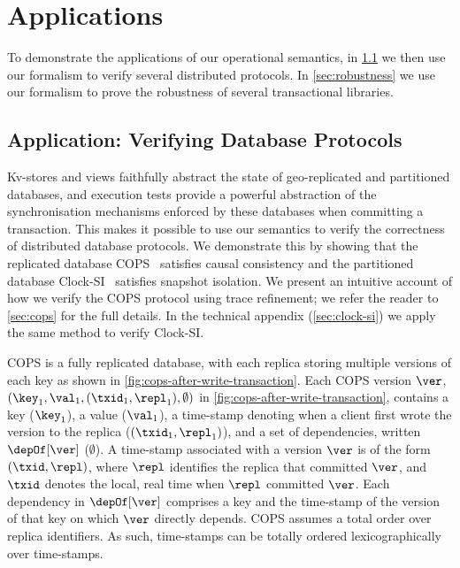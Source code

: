 \section{Applications}
\label{sec:applications}
\label{sec:program-analysis}

To demonstrate the applications of our operational semantics, 
in \cref{sec:verify-impl} we then use our formalism to verify several distributed protocols.
In \cref{sec:robustness} we use our formalism to prove the robustness of several transactional libraries.

\subsection{Application: Verifying Database Protocols}
\label{sec:verify-impl}
Kv-stores and views faithfully abstract the state of geo-replicated and partitioned
databases, and  execution tests provide a powerful abstraction of the synchronisation mechanisms  enforced by these databases when committing a transaction. This makes it
possible to use our 
semantics to verify the correctness of distributed database protocols. 
We  demonstrate this by showing that the replicated database 
COPS~\cite{cops} satisfies causal consistency and
the partitioned database Clock-SI~\cite{clocksi} satisfies snapshot isolation.
We present an intuitive account of how we verify the COPS protocol using trace refinement;
we refer the reader to \cref{sec:cops} for the full details.
In the technical appendix (\cref{sec:clock-si}) we apply the same method to verify Clock-SI.



COPS is a fully replicated database, with each replica storing multiple versions of each key as shown in \cref{fig:cops-after-write-transaction}. 
Each COPS version \( \ver \),
\eg \( (\key_1,\val_1,(\txid_1,\repl_1), \emptyset) \) in \cref{fig:cops-after-write-transaction},
contains a key (\eg $\key_1$), a value (\eg $\val_1$), a time-stamp denoting when a client first wrote the version to the replica (\eg $(\txid_1, \repl_1)$), and a set of dependencies, written $\depOf[\ver]$ (\eg $\emptyset$). 
A time-stamp associated with a version $\ver$ is of the form $(\txid, \repl)$, where $\repl$ identifies the replica that committed $\ver$, and $\txid$ denotes the local, real time when $\repl$ committed $\ver$. 
Each dependency in $\depOf[\ver]$ comprises a key and the time-stamp of the version of that key on which $\ver$ directly depends.  
COPS assumes a total order over replica identifiers. As such, time-stamps can be
totally ordered lexicographically over time-stamps. 

